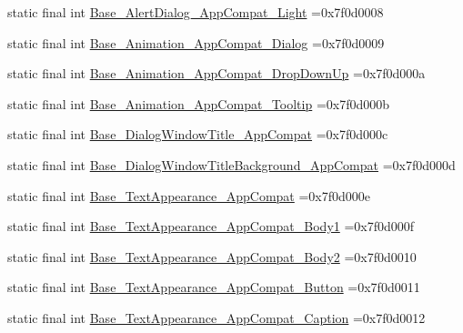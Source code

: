 \begin{DoxyCompactItemize}
static final int \mbox{\hyperlink{classcom_1_1example_1_1trainawearapplication_1_1_r_1_1style_abacb19f6d7cf854ad0b7d3b21aef7e51}{Base\+\_\+\+Alert\+Dialog\+\_\+\+App\+Compat\+\_\+\+Light}} =0x7f0d0008
\item 
static final int \mbox{\hyperlink{classcom_1_1example_1_1trainawearapplication_1_1_r_1_1style_ad9c973efb07ea704d68960f1eedb9c5b}{Base\+\_\+\+Animation\+\_\+\+App\+Compat\+\_\+\+Dialog}} =0x7f0d0009
\item 
static final int \mbox{\hyperlink{classcom_1_1example_1_1trainawearapplication_1_1_r_1_1style_a2bc52cf81059582769870fb16bf3307d}{Base\+\_\+\+Animation\+\_\+\+App\+Compat\+\_\+\+Drop\+Down\+Up}} =0x7f0d000a
\item 
static final int \mbox{\hyperlink{classcom_1_1example_1_1trainawearapplication_1_1_r_1_1style_ad2562a776d5b002510d2127d902c3a41}{Base\+\_\+\+Animation\+\_\+\+App\+Compat\+\_\+\+Tooltip}} =0x7f0d000b
\item 
static final int \mbox{\hyperlink{classcom_1_1example_1_1trainawearapplication_1_1_r_1_1style_ac1c7ea62715f3cd63cef487ae9c960c2}{Base\+\_\+\+Dialog\+Window\+Title\+\_\+\+App\+Compat}} =0x7f0d000c
\item 
static final int \mbox{\hyperlink{classcom_1_1example_1_1trainawearapplication_1_1_r_1_1style_a4980da7fed1aec06bf051c70a770ee59}{Base\+\_\+\+Dialog\+Window\+Title\+Background\+\_\+\+App\+Compat}} =0x7f0d000d
\item 
static final int \mbox{\hyperlink{classcom_1_1example_1_1trainawearapplication_1_1_r_1_1style_a16943693fd736e189c6524704faf4208}{Base\+\_\+\+Text\+Appearance\+\_\+\+App\+Compat}} =0x7f0d000e
\item 
static final int \mbox{\hyperlink{classcom_1_1example_1_1trainawearapplication_1_1_r_1_1style_a965eda01df0681a0702a0d80071c8ffb}{Base\+\_\+\+Text\+Appearance\+\_\+\+App\+Compat\+\_\+\+Body1}} =0x7f0d000f
\item 
static final int \mbox{\hyperlink{classcom_1_1example_1_1trainawearapplication_1_1_r_1_1style_a956e706e34cc76bb3c438fb54a8a00d1}{Base\+\_\+\+Text\+Appearance\+\_\+\+App\+Compat\+\_\+\+Body2}} =0x7f0d0010
\item 
static final int \mbox{\hyperlink{classcom_1_1example_1_1trainawearapplication_1_1_r_1_1style_a979286c2820fd222737900a8efeb7a82}{Base\+\_\+\+Text\+Appearance\+\_\+\+App\+Compat\+\_\+\+Button}} =0x7f0d0011
\item 
static final int \mbox{\hyperlink{classcom_1_1example_1_1trainawearapplication_1_1_r_1_1style_a3f245b9d770e00d22f939767946476fe}{Base\+\_\+\+Text\+Appearance\+\_\+\+App\+Compat\+\_\+\+Caption}} =0x7f0d0012

\end{DoxyCompactItemize}
